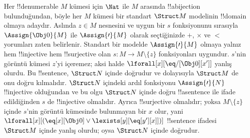 \documentclass[../../../include/open-logic-section]{subfiles}
\begin{document}
\begin{explain}
Her !!{denumerable} $M$ kümesi için $\Nat$ ile $M$ arasında
!!a{bijection} bulunduğundan, böyle her $M$ kümesi bir standart
$\Struct M$ modelinin !!{domain} olmaya adaydır. Aslında
$z\in M$ nesnesini ve uygun bir $s$ fonksiyonunu sırasıyla
$\Assign{\Obj0}{M}$ ile $\Assign{\prime}{M}$ olarak seçtiğinizde
$+$, $\times$ ve $<$ yorumları zaten belirlenir. Standart bir modelde
$\Assign{\prime}{M}$ olmaya yalnız hem !!{injective} hem !!{surjective}
olan $s\colon M\to M\setminus\{z\}$ fonksiyonları uygundur. $s$'nin
görüntü kümesi $z$'yi içeremez; aksi halde
$\lforall[x][\eq/[\Obj0][x']]$ yanlış olurdu. Bu !!{sentence},
$\Struct N$ içinde doğrudur ve dolayısıyla $\Struct M$ de onu doğru
kılmalıdır. $\Struct N$ içindeki ardıl fonksiyonu
$\Assign{\prime}{N}$ !!{injective} olduğundan ve bu olgu $\Struct N$
içinde doğru !!a{sentence} ile ifade edildiğinden $s$ de !!{injective}
olmalıdır. Ayrıca !!{surjective} olmalıdır; yoksa
$M\setminus\{z\}$ içinde $s$'nin görüntü kümesinde bulunmayan bir $x$
olur, yani $\lforall[x][(\eq[x][\Obj0]\lor
\lexists[y][\eq[y'][x]])]$ !!{sentence} ifadesi $\Struct M$ içinde
yanlış olurdu; oysa $\Struct N$ içinde doğrudur.
\end{explain}
\end{document}
